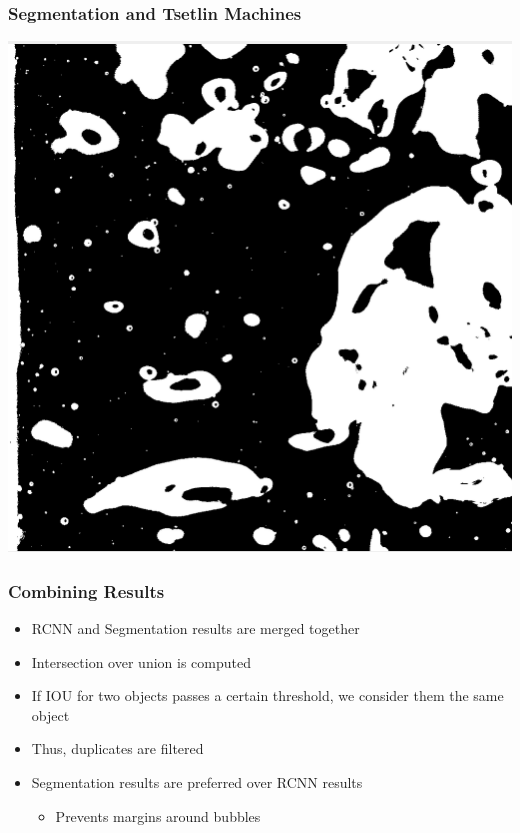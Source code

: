\documentclass{beamer}
\begin{document}
\begin{frame}
    \frametitle{Segmentation and Tsetlin Machines}
    \begin{center}
        \includegraphics[width=0.8\columnwidth]{threshold}
    \end{center}
\end{frame}

\begin{frame}
    \frametitle{Combining Results}

    \begin{itemize}
        \item RCNN and Segmentation results are merged together
        \item Intersection over union is computed
        \item If IOU for two objects passes a certain threshold, we consider them the same object
        \item Thus, duplicates are filtered
        \item Segmentation results are preferred over RCNN results
        \begin{itemize}
            \item Prevents margins around bubbles
        \end{itemize}
    \end{itemize}

\end{frame}
\end{document}
